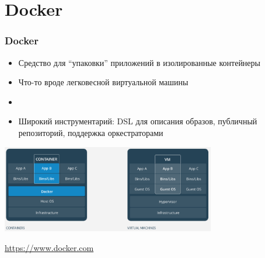 \documentclass[xetex,mathserif,serif]{beamer}
\newcommand{\attribution}[1] {
    \begin{flushright}\begin{scriptsize}\textcolor{gray}{\textcopyright\; #1}\end{scriptsize}\end{flushright}
}
\begin{document}
    \section{Docker}

    \begin{frame}
        \frametitle{Docker}
        \begin{itemize}
            \item Средство для ``упаковки'' приложений в изолированные контейнеры
            \item Что-то вроде легковесной виртуальной машины
            \item \item Широкий инструментарий: DSL для описания образов, публичный репозиторий, поддержка оркестраторами
        \end{itemize}
        \begin{center}
            \includegraphics[width=0.7\textwidth]{docker.png}
            \attribution{\url{https://www.docker.com}}
        \end{center}
    \end{frame}
\end{document}
